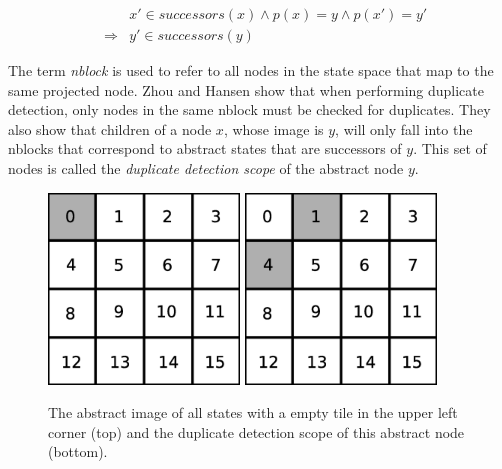 \documentclass{article}
\begin{document}
\begin{eqnarray*}
&&x' \in successors(x) \wedge p(x) = y \wedge p(x') = y' \\
&\Rightarrow& y' \in successors(y)
\end{eqnarray*}

The term \emph{nblock} is used to refer to all nodes in the state
space that map to the same projected node.  Zhou and Hansen show that
when performing duplicate detection, only nodes in the same nblock
must be checked for duplicates.  They also show that children of a
node $x$, whose image is $y$, will only fall into the nblocks that
correspond to abstract states that are successors of $y$.  This set of
nodes is called the \emph{duplicate detection scope} of the abstract
node $y$.

\begin{figure}
\begin{center}
\includegraphics[width=2in]{images/tile-abstraction.eps}
\includegraphics[width=2in]{images/duplicate-detection-scope.eps}
\caption{The abstract image of all states with a empty tile in the
  upper left corner (top) and the duplicate detection scope of this
  abstract node (bottom).}
\label{fig:tile-abstraction}
\end{center}
\end{figure}
\end{document}
